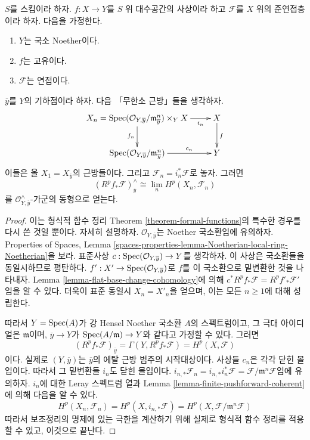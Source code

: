 \begin{lemma}
\label{lemma-formal-functions-stalk}
$S$를 스킴이라 하자. $f : X \to Y$를 $S$ 위 대수공간의 사상이라
하고 $\mathcal{F}$를 $X$ 위의 준연접층이라 하자. 다음을 가정한다.
\begin{enumerate}
\item $Y$는 국소 Noether이다.
\item $f$는 고유이다.
\item $\mathcal{F}$는 연접이다.
\end{enumerate}
$\overline{y}$를 $Y$의 기하점이라 하자. 다음 「무한소 근방」들을
생각하자.
$$
\xymatrix{
X_n =
\Spec(\mathcal{O}_{Y, \overline{y}}/\mathfrak m_{\overline{y}}^n) \times_Y X
\ar[r]_-{i_n} \ar[d]_{f_n} &
X \ar[d]^f \\
\Spec(\mathcal{O}_{Y, \overline{y}}/\mathfrak m_{\overline{y}}^n)
\ar[r]^-{c_n} & Y
}
$$
이들은 올 $X_1 = X_{\overline{y}}$의 근방들이다. 그리고
$\mathcal{F}_n = i_n^*\mathcal{F}$로 놓자. 그러면
$$
\left(R^pf_*\mathcal{F}\right)_{\overline{y}}^\wedge
\cong
\lim_n H^p(X_n, \mathcal{F}_n)
$$
를 $\mathcal{O}_{Y, \overline{y}}^\wedge$-가군의 동형으로 얻는다.
\end{lemma}

\begin{proof}
이는 형식적 함수 정리 Theorem \ref{theorem-formal-functions}의 특수한
경우를 다시 쓴 것일 뿐이다. 자세히 설명하자.
$\mathcal{O}_{Y, \overline{y}}$는 Noether 국소환임에 유의하자.
Properties of Spaces, Lemma
\ref{spaces-properties-lemma-Noetherian-local-ring-Noetherian}을 보라.
표준사상
$c : \mathop{\mathrm{Spec}}(\mathcal{O}_{Y, \overline{y}}) \to Y$를 생각하자. 이 사상은
국소환들을 동일시하므로 평탄하다.
$f' : X' \to \mathop{\mathrm{Spec}}(\mathcal{O}_{Y, \overline{y}})$로 $f$를 이
국소환으로 밑변환한 것을 나타내자. Lemma
\ref{lemma-flat-base-change-cohomology}에 의해
$c^*R^pf_*\mathcal{F} = R^pf'_*\mathcal{F}'$임을 알 수 있다. 더욱이
표준 동일시 $X_n = X'_n$을 얻으며, 이는 모든 $n \geq 1$에 대해
성립한다.

\medskip\noindent
따라서 $Y = \mathop{\mathrm{Spec}}(A)$가 강 Hensel Noether 국소환 $A$의
스펙트럼이고, 그 극대 아이디얼은 $\mathfrak m$이며,
$\overline{y} \to Y$가 $\mathop{\mathrm{Spec}}(A/\mathfrak m) \to Y$와 같다고
가정할 수 있다. 그러면
$$
\left(R^pf_*\mathcal{F}\right)_{\overline{y}} =
\Gamma(Y, R^pf_*\mathcal{F}) =
H^p(X, \mathcal{F})
$$
이다. 실제로 $(Y, \overline{y})$는 $\overline{y}$의 에탈 근방
범주의 시작대상이다. 사상들 $c_n$은 각각 닫힌 몰입이다. 따라서 그
밑변환들 $i_n$도 닫힌 몰입이다.
$i_{n, *}\mathcal{F}_n = i_{n, *}i_n^*\mathcal{F}
= \mathcal{F}/\mathfrak m^n\mathcal{F}$임에 유의하자. $i_n$에 대한
Leray 스펙트럼 열과 Lemma
\ref{lemma-finite-pushforward-coherent}에 의해 다음을 알 수 있다.
$$
H^p(X_n, \mathcal{F}_n) =
H^p(X, i_{n, *}\mathcal{F}) =
H^p(X, \mathcal{F}/\mathfrak m^n\mathcal{F})
$$
따라서 보조정리의 명제에 있는 극한을 계산하기 위해 실제로 형식적
함수 정리를 적용할 수 있고, 이것으로 끝난다.
\end{proof}

